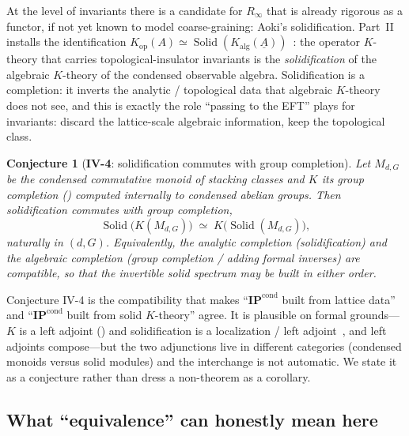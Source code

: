 \documentclass[12pt]{article}
\newcommand{\cond}[1]{\underline{#1}}          %
\newcommand{\IPcond}{\mathbf{IP}^{\mathrm{cond}}}  %
\newcommand{\Kop}{K_{\mathrm{op}}}             %
\newcommand{\Kalg}{K_{\mathrm{alg}}}           %
\newcommand{\Solid}{\operatorname{Solid}}      %
\newcommand{\Groth}{K}                       %
\theoremstyle{definition}
\theoremstyle{remark}
\theoremstyle{plain}
\newtheorem*{conjecture}{Conjecture}
\begin{document}
At the level of invariants there is a candidate for $R_\infty$ that is already
rigorous as a functor, if not yet known to model coarse-graining: Aoki's
solidification. Part~II installs the identification
$\Kop(A)\simeq\Solid(\Kalg(\cond{A}))$~\cite{aoki-solidification}: the operator
$K$-theory that carries topological-insulator invariants is the
\emph{solidification} of the algebraic $K$-theory of the condensed observable
algebra. Solidification is a completion: it inverts the analytic / topological
data that algebraic $K$-theory does not see, and this is exactly the role
``passing to the EFT'' plays for invariants: discard the lattice-scale algebraic
information, keep the topological class.

\begin{conjecture}[\textbf{IV-4}: solidification commutes with group completion]
\label{conj:iv4}
Let $M_{d,G}$ be the condensed commutative monoid of stacking classes and
$\Groth$ its group completion () computed internally to condensed
abelian groups. Then solidification commutes with group completion,
\[
  \Solid\bigl(\Groth(M_{d,G})\bigr)\;\simeq\;\Groth\bigl(\Solid(M_{d,G})\bigr),
\]
naturally in $(d,G)$. Equivalently, the analytic completion (solidification) and
the algebraic completion (group completion / adding formal inverses) are
compatible, so that the invertible solid spectrum may be built in either order.
\end{conjecture}

Conjecture IV-4 is the compatibility that makes ``$\IPcond$ built from lattice
data'' and ``$\IPcond$ built from solid $K$-theory'' agree. It is plausible on
formal grounds---$\Groth$ is a left adjoint () and solidification
is a localization / left adjoint~\cite{clausen-scholze-analytic}, and left
adjoints compose---but the two adjunctions live in different categories (condensed
monoids versus solid modules) and the interchange is not automatic. We state it as
a conjecture rather than dress a non-theorem as a corollary.

\subsection{What ``equivalence'' can honestly mean here}
\end{document}
